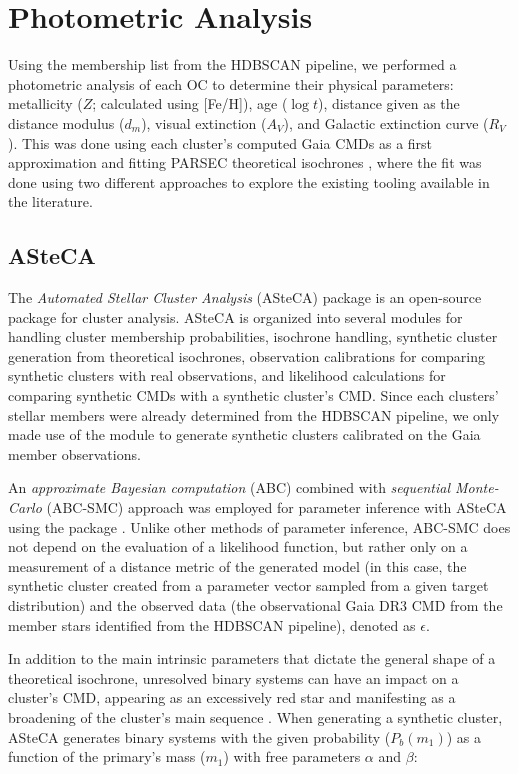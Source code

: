 \section{Photometric Analysis}

Using the membership list from the HDBSCAN pipeline, we performed a photometric analysis of each OC to determine their physical parameters: metallicity ($Z$; calculated using [Fe/H]), age ($\log{t}$), distance given as the distance modulus ($d_m$), visual extinction ($A_V$), and Galactic extinction curve ($R_V$). This was done using each cluster's computed Gaia CMDs as a first approximation and fitting PARSEC theoretical isochrones \autocite{bressanPARSECStellarTracks2012}, where the fit was done using two different approaches to explore the existing tooling available in the literature.

\subsection{ASteCA} \label{sec:asteca}

The \textit{Automated Stellar Cluster Analysis} (ASteCA) package \autocite{perrenASteCAAutomatedStellar2015b} is an open-source package for cluster analysis. ASteCA is organized into several modules for handling cluster membership probabilities, isochrone handling, synthetic cluster generation from theoretical isochrones, observation calibrations for comparing synthetic clusters with real observations, and likelihood calculations for comparing synthetic CMDs with a synthetic cluster's CMD. Since each clusters' stellar members were already determined from the HDBSCAN pipeline, we only made use of the  module to generate synthetic clusters calibrated on the Gaia member observations. 

An \textit{approximate Bayesian computation} (ABC) combined with \textit{sequential Monte-Carlo} (ABC-SMC) approach was employed for parameter inference with ASteCA using the  package \autocite{schaltePyABCEfficientRobust2022}. Unlike other methods of parameter inference, ABC-SMC does not depend on the evaluation of a likelihood function, but rather only on a measurement of a distance metric of the generated model (in this case, the synthetic cluster created from a parameter vector sampled from a given target distribution) and the observed data (the observational Gaia DR3 CMD from the member stars identified from the HDBSCAN pipeline), denoted as $\epsilon$. 

In addition to the main intrinsic parameters that dictate the general shape of a theoretical isochrone, unresolved binary systems can have an impact on a cluster's CMD, appearing as an excessively red star and manifesting as a broadening of the cluster's main sequence \autocite{liModelingUnresolvedBinaries2020}. When generating a synthetic cluster, ASteCA generates binary systems with the given probability ($P_b(m_1)$) as a function of the primary's mass ($m_1$) with free parameters $\alpha$ and $\beta$:

